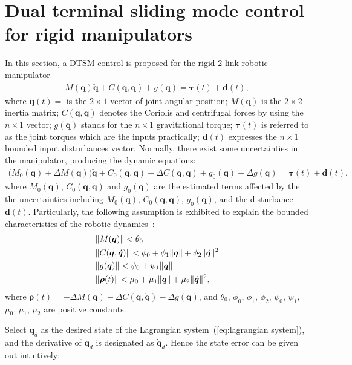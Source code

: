 \documentclass[3p]{elsarticle}
\theoremstyle{plain}
\theoremstyle{remark}
\begin{document}
\section{Dual terminal sliding mode control for rigid manipulators}\label{sec:3}
In this section, a DTSM control is proposed for the rigid $2$-link robotic manipulator
\begin{align}
M(\bm q)\ddot {\bm q}+C(\bm q,\dot {\bm q})+g(\bm q)= \bm\tau(t)+{\bm d}(t),\label{eq:lagrangian system}
\end{align}
where $\bm q(t) = $ is the $2\times 1$ vector of joint angular position; ${M(\bm q)}$ is the $2\times 2$ inertia matrix; ${C(\bm q,\dot{\bm q})}$ denotes the Coriolis and centrifugal forces by using the $n\times1$ vector; ${g(\bm q)}$ stands for the $n\times 1$ gravitational torque; $\bm{\tau}(t)$ is referred to as the joint torques which are the inputs practically; $\bm d(t)$ expresses the $n\times 1$ bounded input disturbances vector. Normally, there exist some uncertainties in the manipulator, producing the dynamic equations:
\begin{align}
(M_0(\bm q)+\Delta {M(\bm q))\ddot {\bm q}}+{C_0(\bm q,\dot {\bm q})+\Delta C(\bm q,\dot {\bm q})}+g_0(\bm q)+\Delta g(\bm q)=\bm {\tau}(t)+\bm{d}(t),
\end{align}
where $M_0(\bm q)$, $C_0(\bm q,\dot {\bm q})$ and $g_0(\bm q)$ are the estimated terms affected by the the uncertainties including $M_0(\bm q)$, $C_0(\bm q,\dot {\bm q})$, $g_0(\bm q)$, and the disturbance $\bm{d}(t)$. Particularly, the following assumption is exhibited to explain the bounded characteristics of the robotic dynamics~\cite{feng2002non}:
\begin{align}
&\Vert M(\bm q)\Vert< \theta_0\notag\\
&\Vert C(\bm q,\dot {\bm q})\Vert< \phi_0+\phi_1\Vert\bm q\Vert+\phi_2\Vert\dot{\bm q}\Vert^2\notag\\
&\Vert g(\bm q)\Vert< \psi_0+\psi_1\Vert\bm q\notag\Vert\\
&\Vert \bm {\rho}(t)\Vert< \mu_0+\mu_1\Vert\bm q\Vert+\mu_2\Vert\dot{\bm q}\Vert^2,\label{eq:manipulator uncertainty}
\end{align}
where $\bm {\rho}(t) = -\Delta M(\bm q)-\Delta C(\bm q,\dot {\bm q})-\Delta g(\bm q)$, and $\theta_0$, $\phi_0$, $\phi_1$, $\phi_2$, $\psi_0$, $\psi_1$, $\mu_0$, $\mu_1$, $\mu_2$ are positive constants.\par
Select $\bm q_d$ as the desired state of the Lagrangian system~(\ref{eq:lagrangian system}), and the derivative of $\bm q_d$ is designated as $\dot {\bm q}_d$. Hence the state error can be given out intuitively:
\end{document}
